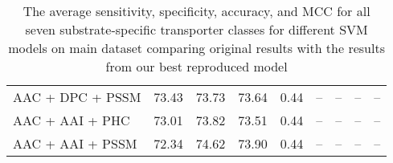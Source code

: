 \begin{table}[ht]
\begin{adjustwidth}{-2.25in}{0in}
\begin{tabular}{|L || g g g g || C C C C|}
    AAC + DPC + PSSM & 73.43 &73.73 &73.64 &0.44& -- & -- & -- & --  \\
    AAC + AAI + PHC & 73.01  & 73.82 &73.51 &  0.44& -- & -- & -- & --  \\
    AAC + AAI + PSSM & 72.34 &  74.62& 73.90 &  0.44 & -- & -- & -- & --  \\
    \hline
    \end{tabular}
    \captionsetup{font=small,width=12cm}
    \caption{The average sensitivity, specificity, accuracy, and MCC for all seven 
    substrate-specific transporter classes for different SVM models on main dataset 
    comparing original results with the results from our best reproduced model}
    \label{tab:all_feature_performance}
\end{adjustwidth}
\end{table}
